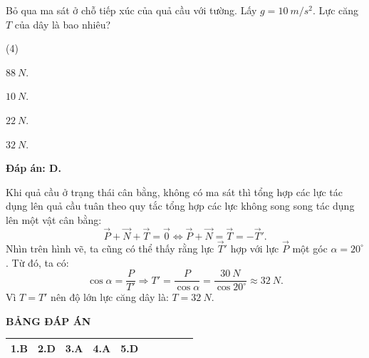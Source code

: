 \begin{enumerate}[label=\bfseries Câu \arabic*:]
{	Bỏ qua ma sát ở chỗ tiếp xúc của quả cầu với tường. Lấy $g=\SI{10}{m/s^2}$. Lực căng $T$ của dây là bao nhiêu?	
	}
	
	\loigiai
	{	\textbf{Đáp án: D.}
		
	Khi quả cầu ở trạng thái cân bằng, không có ma sát thì tổng hợp các lực tác dụng lên quả cầu tuân theo quy tắc tổng hợp các lực không song song tác dụng lên một vật cân bằng: 
	\begin{equation*}
		\vec{P}+\vec{N}+\vec{T}=\vec{0}
		\Leftrightarrow 
		\vec{P}+\vec{N}=\vec{T}=-\vec{T}'.
	\end{equation*}
	Nhìn trên hình vẽ, ta cũng có thể thấy rằng lực $\vec{T}'$ hợp với lực $\vec{P}$ một góc $\alpha=20^{\circ}$. Từ đó, ta có:
	\begin{equation*}
		\cos\alpha =\dfrac{P}{T'}
		\Rightarrow
		T'=\dfrac{P}{\cos\alpha}
		=
		\dfrac{\SI{30}{N}}{\cos 20^{\circ}}
		\approx 
		\SI{32}{N}.
	\end{equation*}
	Vì $T=T'$ nên độ lớn lực căng dây là: $T=\SI{32}{N}$.
	}
	
\end{enumerate}

\whiteBGstarEnd

\loigiai
{
	\begin{center}
		\textbf{BẢNG ĐÁP ÁN}
	\end{center}
	\begin{center}
		\begin{tabular}{|m{2.8em}|m{2.8em}|m{2.8em}|m{2.8em}|m{2.8em}|m{2.8em}|m{2.8em}|m{2.8em}|m{2.8em}|m{2.8em}|}
			\hline
			1.B  & 2.D  & 3.A  & 4.A  & 5.D  & & & & &  \\
			\hline
			
		\end{tabular}
	\end{center}
}
